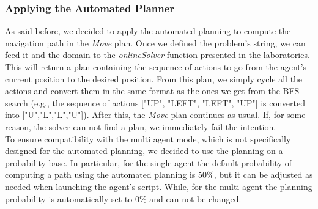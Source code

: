         \subsubsection{Applying the Automated Planner}
            As said before, we decided to apply the automated planning to compute the navigation path in the \textit{Move} plan. Once we defined the problem's string, we can feed it and the domain to the \textit{onlineSolver} function presented in the laboratories. This will return a plan containing the sequence of actions to go from the agent's current position to the desired position. From this plan, we simply cycle all the actions and convert them in the same format as the ones we get from the BFS search (e.g., the sequence of actions ["UP", "LEFT", "LEFT", "UP"] is converted into ["U","L","L","U"]). After this, the \textit{Move} plan continues as usual. If, for some reason, the solver can not find a plan, we immediately fail the intention.
            \medskip\\
            To ensure compatibility with the multi agent mode, which is not specifically designed for the automated planning, we decided to use the planning on a probability base. In particular, for the single agent the default probability of computing a path using the automated planning is 50\%, but it can be adjusted as needed when launching the agent's script. While, for the multi agent the planning probability is automatically set to 0\% and can not be changed.

